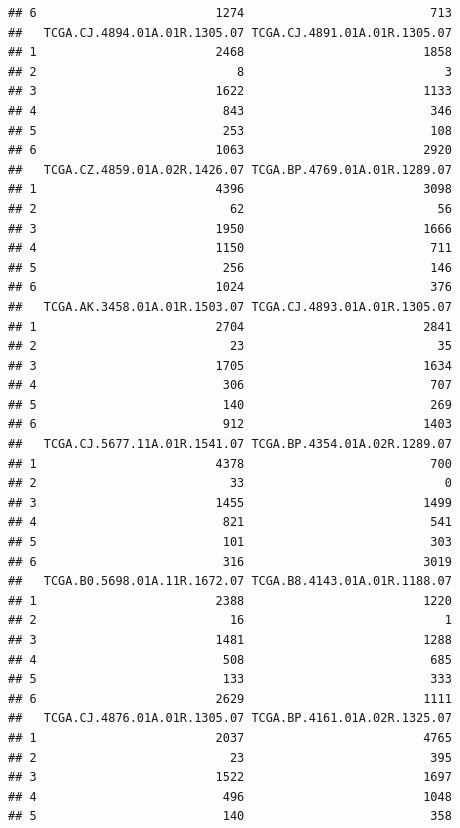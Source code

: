 \documentclass[
]{article}
\begin{document}
\begin{verbatim}
## 6                         1274                          713
##   TCGA.CJ.4894.01A.01R.1305.07 TCGA.CJ.4891.01A.01R.1305.07
## 1                         2468                         1858
## 2                            8                            3
## 3                         1622                         1133
## 4                          843                          346
## 5                          253                          108
## 6                         1063                         2920
##   TCGA.CZ.4859.01A.02R.1426.07 TCGA.BP.4769.01A.01R.1289.07
## 1                         4396                         3098
## 2                           62                           56
## 3                         1950                         1666
## 4                         1150                          711
## 5                          256                          146
## 6                         1024                          376
##   TCGA.AK.3458.01A.01R.1503.07 TCGA.CJ.4893.01A.01R.1305.07
## 1                         2704                         2841
## 2                           23                           35
## 3                         1705                         1634
## 4                          306                          707
## 5                          140                          269
## 6                          912                         1403
##   TCGA.CJ.5677.11A.01R.1541.07 TCGA.BP.4354.01A.02R.1289.07
## 1                         4378                          700
## 2                           33                            0
## 3                         1455                         1499
## 4                          821                          541
## 5                          101                          303
## 6                          316                         3019
##   TCGA.B0.5698.01A.11R.1672.07 TCGA.B8.4143.01A.01R.1188.07
## 1                         2388                         1220
## 2                           16                            1
## 3                         1481                         1288
## 4                          508                          685
## 5                          133                          333
## 6                         2629                         1111
##   TCGA.CJ.4876.01A.01R.1305.07 TCGA.BP.4161.01A.02R.1325.07
## 1                         2037                         4765
## 2                           23                          395
## 3                         1522                         1697
## 4                          496                         1048
## 5                          140                          358

\end{verbatim}
\end{document}
